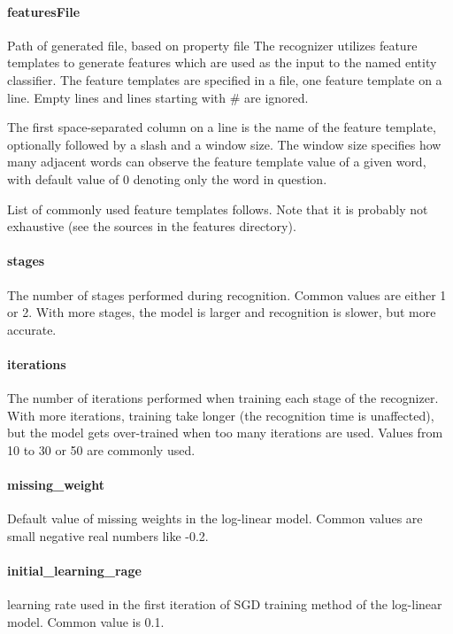 \documentclass[12pt,a4paper]{report}
\begin{document}
\paragraph{featuresFile}
Path of generated file, based on property file 
The recognizer utilizes feature templates to generate features which are used as
the input to the named entity classifier. The feature templates are specified in
a file, one feature template on a line. Empty lines and lines starting with \# are ignored.

The first space-separated column on a line is the name of the feature template,
optionally followed by a slash and a window size. The window size specifies how
many adjacent words can observe the feature template value of a given word, with
default value of 0 denoting only the word in question.

List of commonly used feature templates follows. Note that it is probably not
exhaustive (see the sources in the features directory).

\paragraph{stages}
The number of stages performed during recognition. Common values are either 1 or
2. With more stages, the model is larger and recognition is slower, but more accurate.

\paragraph{iterations}
The number of iterations performed when training each stage of the recognizer.
With more iterations, training take longer (the recognition time is unaffected),
but the model gets over-trained when too many iterations are used. Values from 10
to 30 or 50 are commonly used.

\paragraph{missing\_weight}
Default value of missing weights in the log-linear model. Common values are small
negative real numbers like -0.2.

\paragraph{initial\_learning\_rage}
learning rate used in the first iteration of SGD training method of the log-linear
model. Common value is 0.1.
\end{document}

